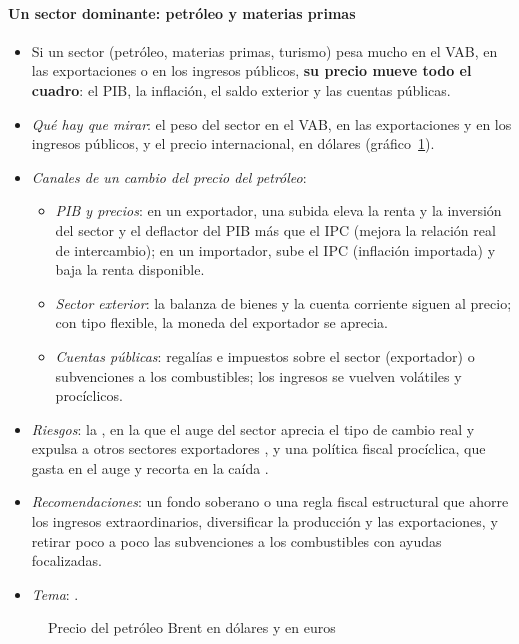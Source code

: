 \documentclass[11pt]{article}
\begin{document}
\paragraph{Un sector dominante: petróleo y materias primas}
\begin{itemize}
\item Si un sector (petróleo, materias primas, turismo) pesa mucho en el VAB, en las exportaciones o en los ingresos públicos, \textbf{su precio mueve todo el cuadro}: el PIB, la inflación, el saldo exterior y las cuentas públicas.
\item \emph{Qué hay que mirar}: el peso del sector en el VAB, en las exportaciones y en los ingresos públicos, y el precio internacional, en dólares (gráfico~\ref{fig:brent}).
\item \emph{Canales de un cambio del precio del petróleo}:
  \begin{itemize}
  \item \emph{PIB y precios}: en un exportador, una subida eleva la renta y la inversión del sector y el deflactor del PIB más que el IPC (mejora la relación real de intercambio); en un importador, sube el IPC (inflación importada) y baja la renta disponible.
  \item \emph{Sector exterior}: la balanza de bienes y la cuenta corriente siguen al precio; con tipo flexible, la moneda del exportador se aprecia.
  \item \emph{Cuentas públicas}: regalías e impuestos sobre el sector (exportador) o subvenciones a los combustibles; los ingresos se vuelven volátiles y procíclicos.
  \end{itemize}
\item \emph{Riesgos}: la , en la que el auge del sector aprecia el tipo de cambio real y expulsa a otros sectores exportadores \parencite{CordenNeary1982}, y una política fiscal procíclica, que gasta en el auge y recorta en la caída \parencite{Kaminsky2004Rains}.
\item \emph{Recomendaciones}: un fondo soberano o una regla fiscal estructural que ahorre los ingresos extraordinarios, diversificar la producción y las exportaciones, y retirar poco a poco las subvenciones a los combustibles con ayudas focalizadas.
\item \emph{Tema}:   .
\end{itemize}

\begin{figure}[!htb]
\centering
\caption{Precio del petróleo Brent en dólares y en euros}\label{fig:brent}
\end{figure}
\end{document}
